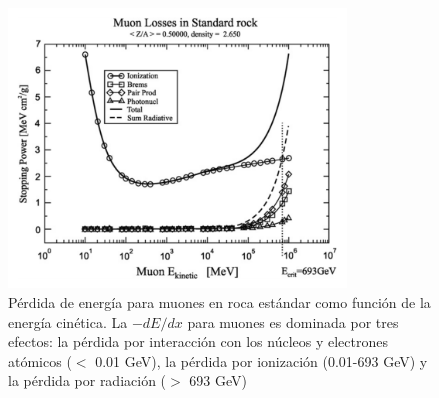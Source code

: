 \begin{figure}[h!]
\begin{center}
\includegraphics[width=0.8\textwidth]{Figures/Stopping.png}
\caption[Pérdida de energía para muones en roca estándar como función de la energía cinética]{Pérdida de energía para muones en roca estándar como función de la energía cinética. La $-dE/dx$ para muones es dominada por tres efectos: la pérdida por interacción con los núcleos y electrones atómicos ($<$ 0.01 GeV), la pérdida por ionización (0.01-693 GeV) y la pérdida por radiación ($>$ 693 GeV) \cite{Annunziata2012, Groom2001}}
\label{Stopping_Power}
\end{center}
\end{figure}




